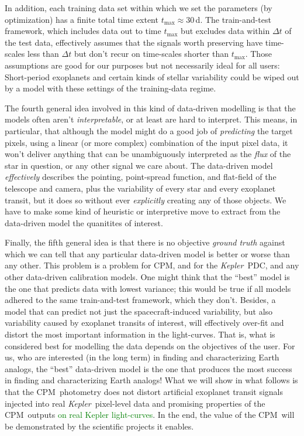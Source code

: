 \documentclass[12pt, preprint]{aastex}
\newcommand{\project}[1]{\textsl{#1}}
\newcommand{\Kepler}{\project{Kepler}}
\newcommand{\name}{CPM}
\newcommand{\revise}[1]{\textcolor{green}{#1}}
\begin{document}
In addition, 
  each training data set within which we set the parameters (by optimization) has a finite total time extent $t_{\max}\approx 30$\,d.
The train-and-test framework, which includes data out to time $t_{\max}$ but excludes data within $\Delta t$ of the test data,
  effectively assumes that the signals worth preserving have time-scales less than $\Delta t$ 
  but don't recur on time-scales shorter than $t_{\max}$.
Those assumptions are good for our purposes but not necessarily ideal for all users:
Short-period exoplanets and certain kinds of stellar variability
  could be wiped out by a model with these settings of the training-data regime.

The fourth general idea involved in this kind of data-driven modelling is that the models often aren't \emph{interpretable}, 
  or at least are hard to interpret.
This means, in particular, that although the model might do a good job of \emph{predicting} the target pixels,
  using a linear (or more complex) combination of the input pixel data,
  it won't deliver anything that can be unambiguously interpreted as the \emph{flux} of the star in question,
  or any other signal we care about.
The data-driven model \emph{effectively} describes the pointing, point-spread function, and flat-field
  of the telescope and camera,
  plus the variability of every star and every exoplanet transit,
  but it does so without ever \emph{explicitly} creating any of those objects.
We have to make some kind of heuristic or interpretive move to extract from the data-driven model the quanitites of interest.

Finally, the fifth general idea is that there is no objective \emph{ground truth} against which we can tell
  that any particular data-driven model is better or worse than any other.
This problem is a problem for \name, and for the \Kepler\ PDC, and any other data-driven calibration models.
One might think that the ``best'' model is the one that predicts data with lowest variance;
  this would be true if all models adhered to the same train-and-test framework, which they don't.
Besides, a model that can predict not just the spacecraft-induced variability,
  but also variability caused by exoplanet transits of interest,
  will effectively over-fit and distort the most important information in the light-curves.
That is, what is considered best for modelling the data depends on the objectives of the user.
For us, who are interested (in the long term) in finding and characterizing Earth analogs,
  the ``best'' data-driven model is the one that produces the most success in finding and characterizing Earth analogs!
What we will show in what follows is that the \name\ photometry does not distort
  artificial exoplanet transit signals injected into real \Kepler\ pixel-level data
  and promising properties of the \name\ outputs \revise{on real Kepler light-curves}.
In the end, the value of the \name\ will be demonstrated by the scientific projects it enables.
\end{document}
